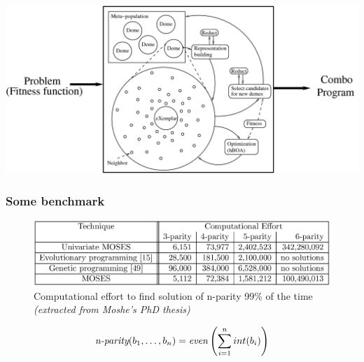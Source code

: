 \documentclass{beamer}
\begin{document}
{  


}

\frame
{
  \begin{center}

  \includegraphics[scale=0.2]{MOSESSumDetails.png}

  \end{center}
}

\frame
{
  \frametitle{Some benchmark}
  \begin{center}
    \begin{figure}
      \includegraphics[scale=0.25]{benchmark.png}
      \caption{Computational effort to find solution of n-parity 99\%
        of the time \emph{(extracted from Moshe's PhD thesis)}}
    \end{figure}
  \end{center}
  \[{\text {\it n-parity}}(b_1, \ldots, b_n) =
  {\it even}\left(\sum_{i=1}^n int(b_i)\right)\]
}
\end{document}
